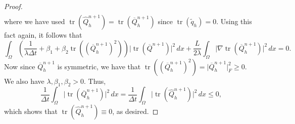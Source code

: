 \documentclass[10pt,a4paper]{amsart}
\begin{document}
\begin{proof}
\begin{align*}
	\end{align*}
	where we have used $\operatorname{tr}(\widehat{Q}_h^{n+1}) = \operatorname{tr}(\overline{Q}_h^{n+1})$ since $\operatorname{tr}(\tilde q_h) = 0$. Using this fact again, it follows that
	\[
	\int_\Omega \left(\frac{1}{\lambda\Delta t} + \beta_1 + \beta_2\operatorname{tr}((\overline{Q}_h^{n+1})^2)\right)\lvert\operatorname{tr}(\overline{Q}^{n+1})\rvert^2\, dx + \frac{L}{2\lambda}\int_\Omega \lvert \nabla \operatorname{tr}(\overline{Q}_h^{n+1})\rvert^2\, dx = 0.
	\]
	Now since $\overline{Q}_h^{n+1}$ is symmetric, we have that $\operatorname{tr}((\overline{Q}_h^{n+1})^2) = \lvert \overline{Q}_h^{n+1}\rvert_F^2 \ge 0$. We also have $\lambda, \beta_1, \beta_2 > 0$. Thus,
	\[
	\frac{1}{\Delta t}\int_\Omega \lvert \operatorname{tr}(\overline{Q}_h^{n+1})\rvert^2\, dx = \frac{1}{\Delta t}\int_\Omega \lvert \operatorname{tr}(\widehat{Q}_h^{n+1})\rvert^2\, dx \le 0,
	\]
	which shows that $\operatorname{tr}(\widehat{Q}_h^{n+1}) \equiv 0$, as desired.
\end{proof}
\end{document}
